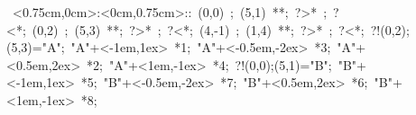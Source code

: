 \hbox{
\xy    <0.75cm,0cm>:<0cm,0.75cm>::
       (0,0) ; (5,1) **\dir{-}; ?>* \dir{>}; ?<*\dir{<}; 
       (0,2) ; (5,3) **\dir{-}; ?>* \dir{>}; ?<*\dir{<};
       (4,-1) ; (1,4) **\dir{-}; ?>* \dir{>}; ?<*\dir{<}; 
	                 ?!{(0,2);(5,3)}="A";
       "A"+<-1em,1ex> *{1};
       "A"+<-0.5em,-2ex> *{3};
       "A"+<0.5em,2ex> *{2};
       "A"+<1em,-1ex> *{4};
	                 ?!{(0,0);(5,1)}="B";
       "B"+<-1em,1ex> *{5};
       "B"+<-0.5em,-2ex> *{7};
       "B"+<0.5em,2ex> *{6};
       "B"+<1em,-1ex> *{8};
       \endxy}
